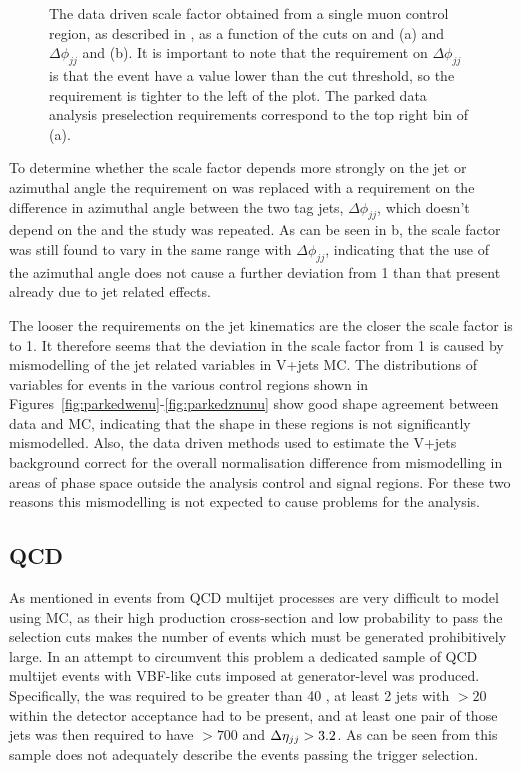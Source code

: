 \begin{figure}
  \caption{The data driven scale factor obtained from a single muon control region, as described in , as a function of the cuts on \jetmetdphi and \Mjj (a) and $\Delta\phi_{jj}$ and \Mjj (b). It is important to note that the requirement on $\Delta\phi_{jj}$ is that the event have a value lower than the cut threshold, so the requirement is tighter to the left of the plot. The parked data analysis preselection requirements correspond to the top right bin of (a).}
  \label{fig:jetmetdphimjjscalefactor}
\end{figure}

To determine whether the scale factor depends more strongly on the jet or \METnoMU azimuthal angle the requirement on \jetmetdphi was replaced with a requirement on the difference in azimuthal angle between the two tag jets, $\Delta\phi_{jj}$, which doesn't depend on the \METnoMU and the study was repeated. As can be seen in b, the scale factor was still found to vary in the same range with $\Delta\phi_{jj}$, indicating that the use of the \METnoMU azimuthal angle does not cause a further deviation from 1 than that present already due to jet related effects.

The looser the requirements on the jet kinematics are the closer the scale factor is to 1. It therefore seems that the deviation in the scale factor from 1 is caused by mismodelling of the jet related variables in V+jets \ac{MC}. The distributions of variables for events in the various control regions shown in Figures~\ref{fig:parkedwenu}-\ref{fig:parkedznunu} show good shape agreement between data and \ac{MC}, indicating that the shape in these regions is not significantly mismodelled. Also, the data driven methods used to estimate the V+jets background correct for the overall normalisation difference from mismodelling in areas of phase space outside the analysis control and signal regions. For these two reasons this mismodelling is not expected to cause problems for the analysis.

\subsection{QCD}
\label{sec:parkedQCD}
As mentioned in  events from \ac{QCD} multijet processes are very difficult to model using \ac{MC}, as their high production cross-section and low probability to pass the selection cuts makes the number of events which must be generated prohibitively large. In an attempt to circumvent this problem a dedicated sample of \ac{QCD} multijet events with \ac{VBF}-like cuts imposed at generator-level was produced. Specifically, the \MET was required to be greater than 40 \GeV, at least 2 jets with \pt$>20$ within the detector acceptance had to be present, and at least one pair of those jets was then required to have \Mjj$>700$ \GeV and $\Delta\eta_{jj}>3.2$. As can be seen from  this sample does not adequately describe the events passing the trigger selection.

